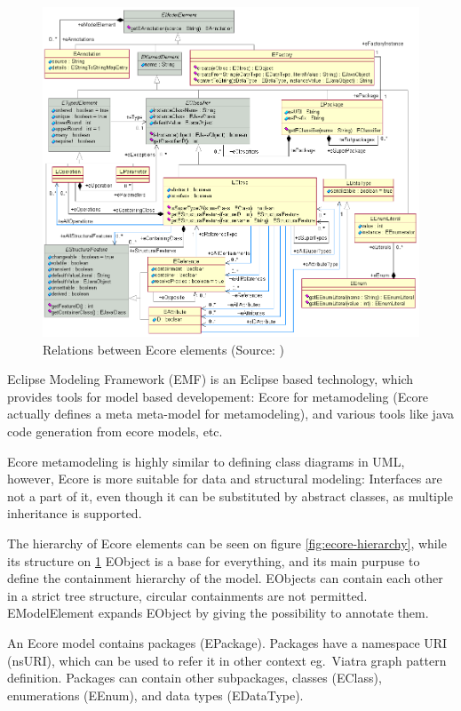 \begin{figure}
	\begin{center}
		\includegraphics[width=\textwidth]{figures/EcoreRelations.png}
		\caption{Relations between Ecore elements (Source: \cite{ecore-package}) }
		\label{fig:ecore-relations}
	\end{center}
\end{figure}

Eclipse Modeling Framework (EMF) is an Eclipse based technology, which provides tools for model based developement: 
Ecore \cite{ecore-package} for metamodeling (Ecore actually defines a meta meta-model for metamodeling), and various tools like java code generation from ecore models, etc.

Ecore metamodeling is highly similar to defining class diagrams in UML, however, 
Ecore is more suitable for data and structural modeling: Interfaces are not a part of it, even though it can be substituted by abstract classes, as multiple inheritance is supported.

The hierarchy of Ecore elements can be seen on figure \ref{fig:ecore-hierarchy}, while its structure on \ref{fig:ecore-relations}
EObject is a base for everything, and its main purpuse to define the containment hierarchy of the model. 
EObjects can contain each other in a strict tree structure, circular containments are not permitted.
EModelElement expands EObject by giving the possibility to annotate them.

An Ecore model contains packages (EPackage). 
Packages have a namespace URI (nsURI), which can be used to refer it in other context eg.\ Viatra graph pattern definition.
Packages can contain other subpackages, classes (EClass), enumerations (EEnum), and data types (EDataType).

